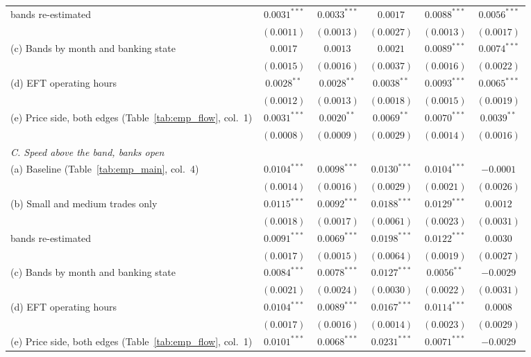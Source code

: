 \begin{tabular}{lccccc}
\quad bands re-estimated & $0.0031^{***}$ & $0.0033^{***}$ & $0.0017$ & $0.0088^{***}$ & $0.0056^{***}$ \\
 & $(0.0011)$ & $(0.0013)$ & $(0.0027)$ & $(0.0013)$ & $(0.0017)$ \\
(c) Bands by month and banking state & $0.0017$ & $0.0013$ & $0.0021$ & $0.0089^{***}$ & $0.0074^{***}$ \\
 & $(0.0015)$ & $(0.0016)$ & $(0.0037)$ & $(0.0016)$ & $(0.0022)$ \\
(d) EFT operating hours & $0.0028^{**}$ & $0.0028^{**}$ & $0.0038^{**}$ & $0.0093^{***}$ & $0.0065^{***}$ \\
 & $(0.0012)$ & $(0.0013)$ & $(0.0018)$ & $(0.0015)$ & $(0.0019)$ \\
(e) Price side, both edges (Table~\ref{tab:emp_flow}, col.\ 1) & $0.0031^{***}$ & $0.0020^{**}$ & $0.0069^{**}$ & $0.0070^{***}$ & $0.0039^{**}$ \\
 & $(0.0008)$ & $(0.0009)$ & $(0.0029)$ & $(0.0014)$ & $(0.0016)$ \\
\multicolumn{6}{l}{\emph{C. Speed above the band, banks open}} \\
(a) Baseline (Table~\ref{tab:emp_main}, col.\ 4) & $0.0104^{***}$ & $0.0098^{***}$ & $0.0130^{***}$ & $0.0104^{***}$ & $-0.0001$ \\
 & $(0.0014)$ & $(0.0016)$ & $(0.0029)$ & $(0.0021)$ & $(0.0026)$ \\
(b) Small and medium trades only & $0.0115^{***}$ & $0.0092^{***}$ & $0.0188^{***}$ & $0.0129^{***}$ & $0.0012$ \\
 & $(0.0018)$ & $(0.0017)$ & $(0.0061)$ & $(0.0023)$ & $(0.0031)$ \\
\quad bands re-estimated & $0.0091^{***}$ & $0.0069^{***}$ & $0.0198^{***}$ & $0.0122^{***}$ & $0.0030$ \\
 & $(0.0017)$ & $(0.0015)$ & $(0.0064)$ & $(0.0019)$ & $(0.0027)$ \\
(c) Bands by month and banking state & $0.0084^{***}$ & $0.0078^{***}$ & $0.0127^{***}$ & $0.0056^{**}$ & $-0.0029$ \\
 & $(0.0021)$ & $(0.0024)$ & $(0.0030)$ & $(0.0022)$ & $(0.0031)$ \\
(d) EFT operating hours & $0.0104^{***}$ & $0.0089^{***}$ & $0.0167^{***}$ & $0.0114^{***}$ & $0.0008$ \\
 & $(0.0017)$ & $(0.0016)$ & $(0.0014)$ & $(0.0023)$ & $(0.0029)$ \\
(e) Price side, both edges (Table~\ref{tab:emp_flow}, col.\ 1) & $0.0101^{***}$ & $0.0068^{***}$ & $0.0231^{***}$ & $0.0071^{***}$ & $-0.0029$ \\

\end{tabular}
